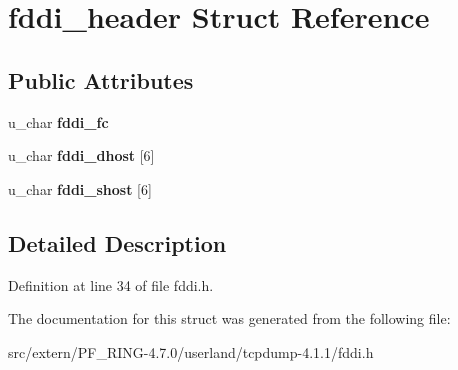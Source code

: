 \hypertarget{structfddi__header}{
\section{fddi\_\-header Struct Reference}
\label{structfddi__header}
}
\subsection*{Public Attributes}
\begin{DoxyCompactItemize}
\item 
\hypertarget{structfddi__header_a07de6cd629a4fa9e28daa152d136bf82}{
u\_\-char {\bfseries fddi\_\-fc}}
\label{structfddi__header_a07de6cd629a4fa9e28daa152d136bf82}

\item 
\hypertarget{structfddi__header_ae78baad1700aabd2baa4fef5a83fb5c8}{
u\_\-char {\bfseries fddi\_\-dhost} \mbox{[}6\mbox{]}}
\label{structfddi__header_ae78baad1700aabd2baa4fef5a83fb5c8}

\item 
\hypertarget{structfddi__header_a7dfac681719dfc4101d5aae62cdf1863}{
u\_\-char {\bfseries fddi\_\-shost} \mbox{[}6\mbox{]}}
\label{structfddi__header_a7dfac681719dfc4101d5aae62cdf1863}

\end{DoxyCompactItemize}


\subsection{Detailed Description}


Definition at line 34 of file fddi.h.



The documentation for this struct was generated from the following file:\begin{DoxyCompactItemize}
\item 
src/extern/PF\_\-RING-\/4.7.0/userland/tcpdump-\/4.1.1/fddi.h\end{DoxyCompactItemize}
